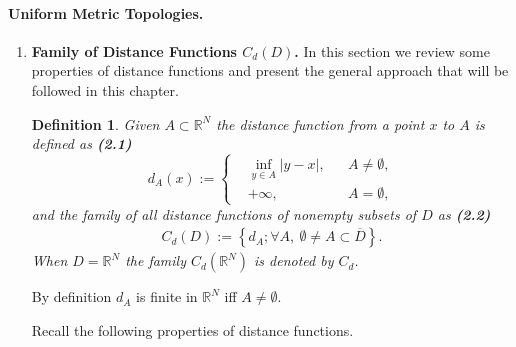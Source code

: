 \documentclass{book}
\numberwithin{equation}{section}
\newtheorem{definition}{Definition}[section]
\begin{document}
\paragraph{Uniform Metric Topologies.}
\begin{enumerate}
    \item \textbf{Family of Distance Functions $C_d(D)$.} In this section we review some properties of distance functions and present the general approach that will be followed in this chapter.
    
    \begin{definition}
        Given $A\subset\mathbb{R}^N$ the \emph{distance function} from a point $x$ to $A$ is defined as \textbf{(2.1)}
        \begin{equation*}
            d_A(x) := \left\{\begin{split}
                &\inf_{y\in A} |y - x|, &&A\ne\emptyset,\\
                &+\infty, &&A = \emptyset,
            \end{split}\right.
        \end{equation*}
        and the family of all distance functions of nonempty subsets of $D$ as \textbf{(2.2)}
        \begin{align*}
            C_d(D) := \left\{d_A;\forall A,\ \emptyset\ne A\subset\overline{D}\right\}.
        \end{align*}
        When $D = \mathbb{R}^N$ the family $C_d(\mathbb{R}^N)$ is denoted by $C_d$.
    \end{definition}
    By definition $d_A$ is finite in $\mathbb{R}^N$ iff $A\ne\emptyset$.
    
    Recall the following properties of distance functions.
    

\end{enumerate}
\end{document}
